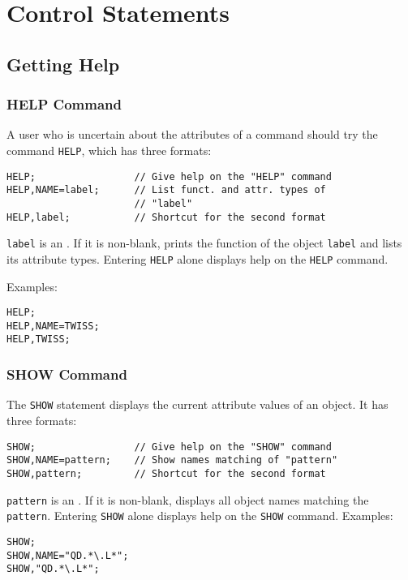 \chapter{Control Statements}
\label{chp:control}

\section{Getting Help}

\subsection{HELP Command}
\label{sec:help}
A user who is uncertain about the attributes of a command
should try the command \texttt{HELP}, which has three formats:
\begin{verbatim}
HELP;                 // Give help on the "HELP" command
HELP,NAME=label;      // List funct. and attr. types of 
                      // "label"
HELP,label;           // Shortcut for the second format
\end{verbatim}
\texttt{label} is an .
If it is non-blank,
\opal prints the function of the object \texttt{label} and lists its
attribute types.
Entering \texttt{HELP} alone displays help on the \texttt{HELP}
command. 

\noindent Examples:
\begin{verbatim}
HELP;
HELP,NAME=TWISS;
HELP,TWISS;
\end{verbatim}

\subsection{SHOW Command}
\label{sec:show}
The \texttt{SHOW} statement displays the current attribute values
of an object.
It has three formats:
\begin{verbatim}
SHOW;                 // Give help on the "SHOW" command
SHOW,NAME=pattern;    // Show names matching of "pattern"
SHOW,pattern;         // Shortcut for the second format
\end{verbatim}
\texttt{pattern} is an .
If it is non-blank,
\opal displays all object names matching the \texttt{pattern}.
Entering \texttt{SHOW} alone displays help on the \texttt{SHOW}
command. 
\noindent Examples:
\begin{verbatim}
SHOW;
SHOW,NAME="QD.*\.L*";
SHOW,"QD.*\.L*";
\end{verbatim}

